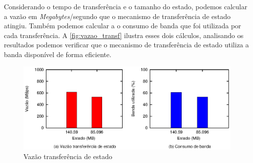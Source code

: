 \begin{table}[htb]
\end{table}

\begin{table}[htb]
\end{table}

Considerando o tempo de transferência e o tamanho do estado, podemos calcular a vazão em
\emph{Megabytes}/segundo que o mecanismo de transferência de estado atingiu. Também
podemos calcular a o consumo de banda que foi utilizada por cada transferência. A
\autoref{fig:vazao_transf} ilustra esses dois cálculos, analisando os resultados podemos
verificar que o mecanismo de transferência de estado utiliza a banda disponível de forma
eficiente.

\begin{figure}[ht]
  \centering
  \includegraphics[width=14cm]{conteudo/capitulos/figuras/vazao-transf.eps}
  \caption{Vazão transferência de estado}
  \label{fig:vazao_transf}
\end{figure}

